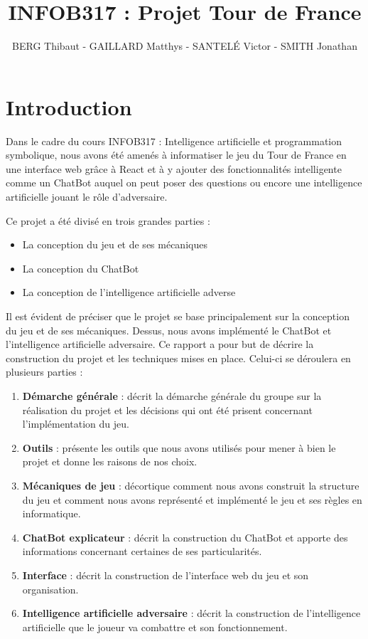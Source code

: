 \documentclass[a4paper, 11pt]{article}
\title{INFOB317 : Projet Tour de France}
\author{BERG Thibaut - GAILLARD Matthys - SANTELÉ Victor - SMITH Jonathan}
\begin{document}
\maketitle

\newpage

\section{Introduction}

Dans le cadre du cours INFOB317 : Intelligence artificielle et programmation symbolique, nous avons été amenés à informatiser le jeu du Tour de France en une interface web grâce à React et à y ajouter des fonctionnalités intelligente comme un ChatBot auquel on peut poser des questions ou encore une intelligence artificielle jouant le rôle d'adversaire.\newline

Ce projet a été divisé en trois grandes parties :
\begin{itemize}
    \item La conception du jeu et de ses mécaniques
    \item La conception du ChatBot
    \item La conception de l'intelligence artificielle adverse\newline
\end{itemize}

Il est évident de préciser que le projet se base principalement sur la conception du jeu et de ses mécaniques. Dessus, nous avons implémenté le ChatBot et l'intelligence artificielle adversaire. Ce rapport a pour but de décrire la construction du projet et les techniques mises en place. Celui-ci se déroulera en plusieurs parties : 

\begin{enumerate}
	\item \textbf{Démarche générale} : décrit la démarche générale du groupe sur la réalisation du projet et les décisions qui ont été prisent concernant l'implémentation du jeu.
	\item \textbf{Outils} : présente les outils que nous avons utilisés pour mener à bien le projet et donne les raisons de nos choix.
	\item \textbf{Mécaniques de jeu} : décortique comment nous avons construit la structure du jeu et comment nous avons représenté et implémenté le jeu et ses règles en informatique.
	\item \textbf{ChatBot explicateur} : décrit la construction du ChatBot et apporte des informations concernant certaines de ses particularités.
	\item \textbf{Interface} : décrit la construction de l'interface web du jeu et son organisation.
	\item \textbf{Intelligence artificielle adversaire} : décrit la construction de l'intelligence artificielle que le joueur va combattre et son fonctionnement.\newline
\end{enumerate}
\end{document}
